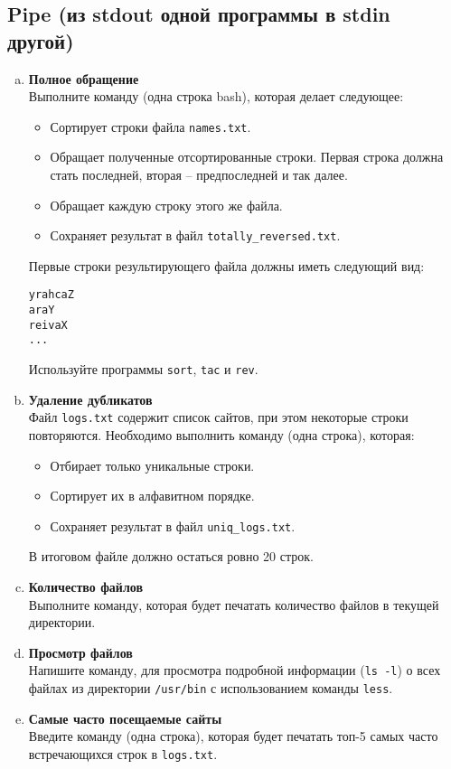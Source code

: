 \documentclass{article}
\begin{document}
\subsection{Pipe (из stdout одной программы в stdin другой)}
\begin{enumerate}[a.]
\item \textbf{Полное обращение}\\
Выполните команду (одна строка bash), которая делает следующее:
\begin{itemize}
\item Сортирует строки файла \texttt{names.txt}. 
\item Обращает полученные отсортированные строки. Первая строка должна стать последней, вторая -- предпоследней и так далее.
\item Обращает каждую строку этого же файла.
\item Сохраняет результат в файл \texttt{totally\_reversed.txt}.
\end{itemize}
Первые строки результирующего файла должны иметь следующий вид:
\begin{lstlisting}
yrahcaZ
araY
reivaX
...
\end{lstlisting}
Используйте программы \texttt{sort}, \texttt{tac} и \texttt{rev}.

\item \textbf{Удаление дубликатов}\\
Файл \texttt{logs.txt} содержит список сайтов, при этом некоторые строки повторяются.
Необходимо выполнить команду (одна строка), которая:
\begin{itemize}
\item Отбирает только уникальные строки.
\item Сортирует их в алфавитном порядке.
\item Сохраняет результат в файл \texttt{uniq\_logs.txt}.
\end{itemize}
В итоговом файле должно остаться ровно 20 строк.

\item \textbf{Количество файлов}\\
Выполните команду, которая будет печатать количество файлов в текущей директории.

\item \textbf{Просмотр файлов}\\
Напишите команду, для просмотра подробной информации (\texttt{ls -l}) о всех файлах из директории \texttt{/usr/bin} с использованием команды \texttt{less}.

\item \textbf{Самые часто посещаемые сайты}\\
Введите команду (одна строка), которая будет печатать топ-5 самых часто встречающихся строк в \texttt{logs.txt}.
\end{enumerate}
\end{document}
